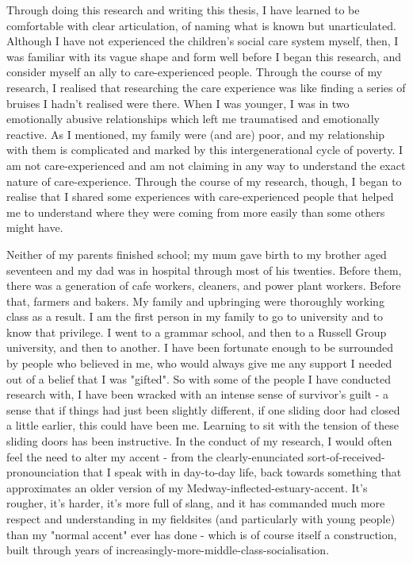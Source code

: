 Through doing this research and writing this thesis, I have learned to be comfortable with clear articulation, of naming what is known but unarticulated. Although I have not experienced the children’s social care system myself, then, I was familiar with its vague shape and form well before I began this research, and consider myself an ally to care-experienced people. Through the course of my research, I realised that researching the care experience was like finding a series of bruises I hadn’t realised were there. When I was younger, I was in two emotionally abusive relationships which left me traumatised and  emotionally reactive. As I mentioned, my family were (and are) poor, and my relationship with them is complicated and marked by this intergenerational cycle of poverty. I am not care-experienced and am not claiming in any way to understand the exact nature of care-experience. Through the course of my research, though, I began to realise that I shared some experiences with care-experienced people that helped me to understand where they were coming from more easily than some others might have. 

Neither of my parents finished school; my mum gave birth to my brother aged seventeen and my dad was in hospital through most of his twenties. Before them, there was a generation of cafe workers, cleaners, and power plant workers. Before that, farmers and bakers. My family and upbringing were thoroughly working class as a result. I am the first person in my family to go to university and to know that privilege. I went to a grammar school, and then to a Russell Group university, and then to another. I have been fortunate enough to be surrounded by people who believed in me, who would always give me any support I needed out of a belief that I was "gifted". So with some of the people I have conducted research with, I have been wracked with an intense sense of survivor’s guilt - a sense that if things had just been slightly different, if one sliding door had closed a little earlier, this could have been me. Learning to sit with the tension of these sliding doors has been instructive. In the conduct of my research, I would often feel the need to alter my accent - from the clearly-enunciated sort-of-received-pronounciation that I speak with in day-to-day life, back towards something that approximates an older version of my Medway-inflected-estuary-accent. It’s rougher, it’s harder, it’s more full of slang, and it has commanded much more respect and understanding in my fieldsites (and particularly with young people) than my "normal accent" ever has done - which is of course itself a construction, built through years of increasingly-more-middle-class-socialisation.

